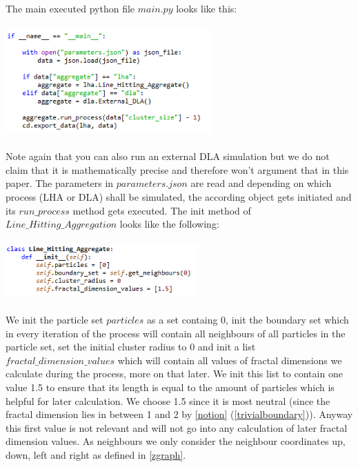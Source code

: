 \documentclass[12pt,a4paper]{scrartcl}
\numberwithin{equation}{subsection}
\newcommand{\1}{\mathbbm{1}}
\numberwithin{equation}{section}
\theoremstyle{definition}
\begin{document}
\\The main executed python file $\mathit{main.py}$ looks like this:\\
\\
\includegraphics[height=4cm]{images/code-snippets/mainpy.png} \\
\\
Note again that you can also run an external DLA simulation but we do not claim that it is mathematically precise and therefore won't argument that in this paper. The parameters in $\mathit{parameters.json}$ are read and depending on which process (LHA or DLA) shall be simulated, the according object gets initiated and its $\mathit{run\_process}$ method gets executed. The init method of $\mathit{Line\_Hitting\_Aggregation}$ looks like the following:\\
\\
\includegraphics[height=2cm]{images/code-snippets/lhainit.png} \\
\\
We init the particle set $\mathit{particles}$ as a set containg $0$, init the boundary set which in every iteration of the process will contain all neighbours of all particles in the particle set, set the initial cluster radius to $0$ and init a list $\mathit{fractal\_dimension\_values}$ which will contain all values of fractal dimensions we calculate during the process, more on that later. We init this list to contain one value 1.5 to ensure that its length is equal to the amount of particles which is helpful for later calculation. We choose 1.5 since it is most neutral (since the fractal dimension lies in between 1 and 2 by \ref{notion} (\ref{trivialboundary})). Anyway this first value is not relevant and will not go into any calculation of later fractal dimension values. As neighbours we only consider the neighbour coordinates up, down, left and right as defined in \ref{zgraph}. \\
\end{document}
